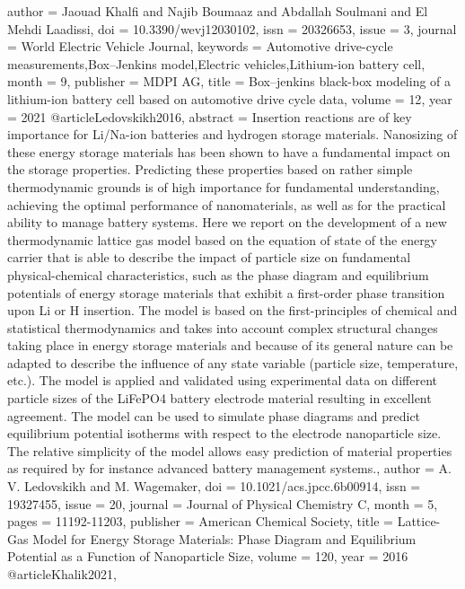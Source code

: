 {{{{{{{   author = {Jaouad Khalfi and Najib Boumaaz and Abdallah Soulmani and El Mehdi Laadissi},
   doi = {10.3390/wevj12030102},
   issn = {20326653},
   issue = {3},
   journal = {World Electric Vehicle Journal},
   keywords = {Automotive drive-cycle measurements,Box–Jenkins model,Electric vehicles,Lithium-ion battery cell},
   month = {9},
   publisher = {MDPI AG},
   title = {Box–jenkins black-box modeling of a lithium-ion battery cell based on automotive drive cycle data},
   volume = {12},
   year = {2021}
}
@article{Ledovskikh2016,
   abstract = {Insertion reactions are of key importance for Li/Na-ion batteries and hydrogen storage materials. Nanosizing of these energy storage materials has been shown to have a fundamental impact on the storage properties. Predicting these properties based on rather simple thermodynamic grounds is of high importance for fundamental understanding, achieving the optimal performance of nanomaterials, as well as for the practical ability to manage battery systems. Here we report on the development of a new thermodynamic lattice gas model based on the equation of state of the energy carrier that is able to describe the impact of particle size on fundamental physical-chemical characteristics, such as the phase diagram and equilibrium potentials of energy storage materials that exhibit a first-order phase transition upon Li or H insertion. The model is based on the first-principles of chemical and statistical thermodynamics and takes into account complex structural changes taking place in energy storage materials and because of its general nature can be adapted to describe the influence of any state variable (particle size, temperature, etc.). The model is applied and validated using experimental data on different particle sizes of the LiFePO4 battery electrode material resulting in excellent agreement. The model can be used to simulate phase diagrams and predict equilibrium potential isotherms with respect to the electrode nanoparticle size. The relative simplicity of the model allows easy prediction of material properties as required by for instance advanced battery management systems.},
   author = {A. V. Ledovskikh and M. Wagemaker},
   doi = {10.1021/acs.jpcc.6b00914},
   issn = {19327455},
   issue = {20},
   journal = {Journal of Physical Chemistry C},
   month = {5},
   pages = {11192-11203},
   publisher = {American Chemical Society},
   title = {Lattice-Gas Model for Energy Storage Materials: Phase Diagram and Equilibrium Potential as a Function of Nanoparticle Size},
   volume = {120},
   year = {2016}
}
@article{Khalik2021,
}}}}}}}
